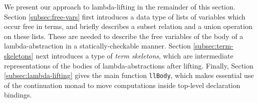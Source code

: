 \documentclass[natbib]{sigplanconf}
\begin{document}
We present our approach to lambda-lifting in the remainder of this
section. Section \ref{subsec:free-vars} first introduces a data type
of lists of variables which occur free in terms, and briefly describes
a subset relation and a union operation on these lists. These are
needed to describe the free variables of the body of a
lambda-abstraction in a statically-checkable manner. Section
\ref{subsec:term-skeletons} next introduces a type of \emph{term
  skeletons}, which are intermediate representations of the bodies of
lambda-abstractions after lifting. Finally, Section
\ref{subsec:lambda-lifting} gives the main function
\lstinline{llBody}, which makes essential use of the continuation
monad to move computations inside top-level declaration bindings.







\end{document}
